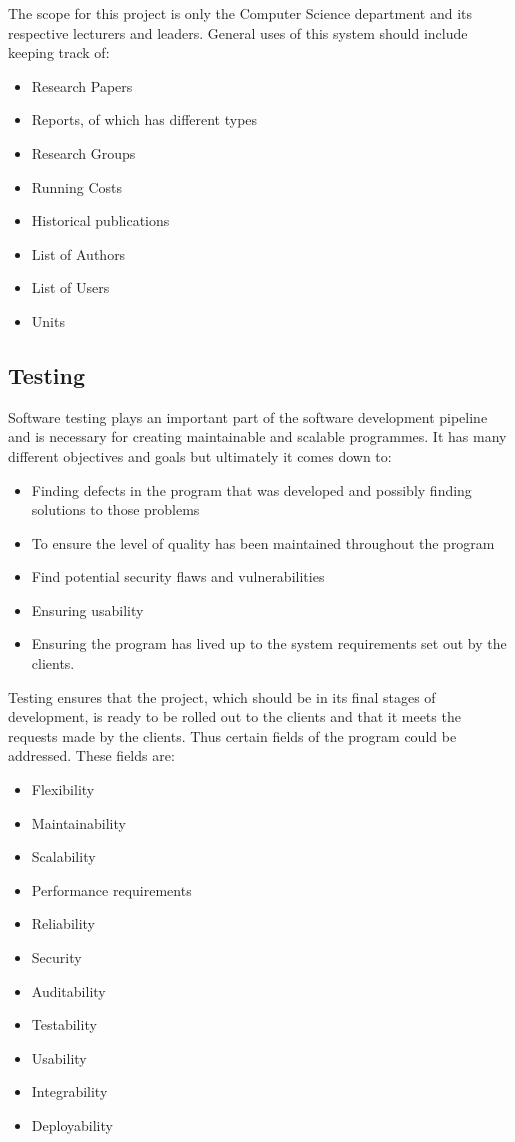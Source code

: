 \documentclass{article}
\begin{document}
    The scope for this project is only the Computer Science department and its respective lecturers and leaders.
    General uses of this system should include keeping track of:
    \begin{itemize}
        \item Research Papers
        \item Reports, of which has different types
        \item Research Groups
        \item Running Costs
        \item Historical publications
        \item List of Authors
        \item List of Users
        \item Units 
    
    \end{itemize}
    \subsection{Testing}
        Software testing plays an important part of the software development pipeline and is necessary for creating maintainable and scalable programmes. It has many different objectives and goals but ultimately it comes down to:
        \begin{itemize}
            \item Finding defects in the program that was developed and possibly finding solutions to those problems
            \item To ensure the level of quality has been maintained throughout the program
            \item Find potential security flaws and vulnerabilities
            \item Ensuring usability
            \item Ensuring the program has lived up to the system requirements set out by the clients.
        \end{itemize}
    Testing ensures that the project, which should be in its final stages of development, is ready to be rolled out to the clients and that it meets the requests made by the clients. Thus certain fields of the program could be addressed. These fields are:
        \begin{itemize}
            \item Flexibility
            \item Maintainability
            \item Scalability
            \item Performance requirements
            \item Reliability
            \item Security
            \item Auditability
            \item Testability
            \item Usability
            \item Integrability
            \item Deployability
        \end{itemize}
\end{document}
